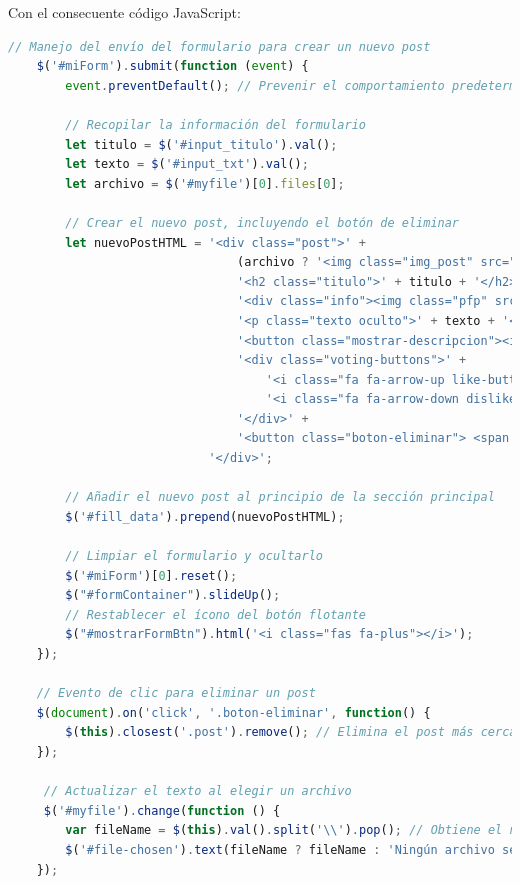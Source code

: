 \documentclass{article}
\begin{document}
Con el consecuente código JavaScript:

\begin{lstlisting}[language=JavaScript, caption=Nuevo post]
    // Manejo del envío del formulario para crear un nuevo post
    $('#miForm').submit(function (event) {
        event.preventDefault(); // Prevenir el comportamiento predeterminado

        // Recopilar la información del formulario
        let titulo = $('#input_titulo').val();
        let texto = $('#input_txt').val();
        let archivo = $('#myfile')[0].files[0];

        // Crear el nuevo post, incluyendo el botón de eliminar
        let nuevoPostHTML = '<div class="post">' +
                                (archivo ? '<img class="img_post" src="' + URL.createObjectURL(archivo) + '">' : '') +
                                '<h2 class="titulo">' + titulo + '</h2>' +
                                '<div class="info"><img class="pfp" src="../Images/pfp.png" width="50px" height="50px"><p class="autor">GUEST</p></div>' +
                                '<p class="texto oculto">' + texto + '</p>' +
                                '<button class="mostrar-descripcion"><i class="fas fa-plus"></i> Descripción</button>' +
                                '<div class="voting-buttons">' +
                                    '<i class="fa fa-arrow-up like-button" aria-hidden="true"></i><span class="likes-count">0</span>' +
                                    '<i class="fa fa-arrow-down dislike-button" aria-hidden="true"></i><span class="dislikes-count">0</span>' +
                                '</div>' +
                                '<button class="boton-eliminar"> <span class="texto-eliminar animate__animated">Delete</span><i class="fas fa-trash animate__animated"></i></button>'
                            '</div>';

        // Añadir el nuevo post al principio de la sección principal
        $('#fill_data').prepend(nuevoPostHTML);

        // Limpiar el formulario y ocultarlo
        $('#miForm')[0].reset();
        $("#formContainer").slideUp();
        // Restablecer el ícono del botón flotante
        $("#mostrarFormBtn").html('<i class="fas fa-plus"></i>');
    });

    // Evento de clic para eliminar un post
    $(document).on('click', '.boton-eliminar', function() {
        $(this).closest('.post').remove(); // Elimina el post más cercano al botón clickeado
    });

     // Actualizar el texto al elegir un archivo
     $('#myfile').change(function () {
        var fileName = $(this).val().split('\\').pop(); // Obtiene el nombre del archivo
        $('#file-chosen').text(fileName ? fileName : 'Ningún archivo seleccionado'); // Actualiza el texto
    });
\end{lstlisting}
\end{document}
